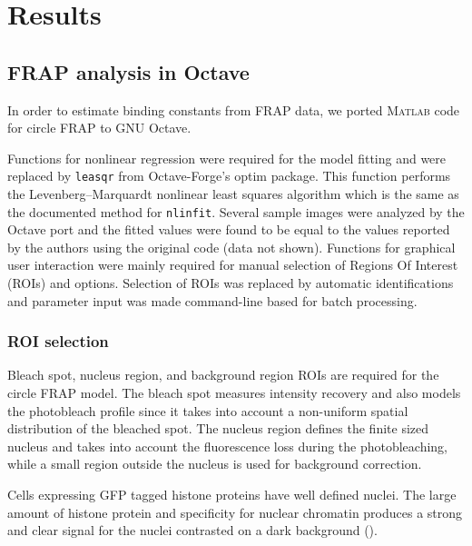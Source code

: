 \section{Results}

  \subsection{FRAP analysis in Octave}

    In order to estimate binding constants from FRAP data, we ported
    \textsc{Matlab} code for circle FRAP \citep{mueller2008evidence} to GNU Octave.

    Functions for nonlinear regression were required for the model
    fitting and were replaced by \texttt{leasqr}
    from Octave-Forge's optim package. This function performs the
    Levenberg--Marquardt nonlinear least squares algorithm which is the
    same as the documented method for \texttt{nlinfit}.
    Several sample images were analyzed
    by the Octave port and the fitted values were found to be equal to
    the values reported by the authors using the original code (data not shown).
    Functions for graphical user interaction were mainly required
    for manual selection of Regions Of Interest (ROIs) and options.
    Selection of ROIs was replaced by automatic identifications
    and parameter input was made command-line based for batch processing.

    \subsubsection{ROI selection}

      Bleach spot, nucleus region, and background region ROIs are required
      for the circle FRAP model. The bleach spot measures intensity recovery
      and also models the photobleach profile since it takes into account
      a non-uniform spatial distribution of the bleached spot. The nucleus
      region defines the finite sized nucleus and takes into account
      the fluorescence loss during the photobleaching,
      while a small region outside the nucleus is used for background correction.

      Cells expressing GFP tagged histone proteins have well defined nuclei.
      The large amount of histone protein and specificity for nuclear chromatin
      produces a strong and clear signal for the nuclei contrasted on a dark background ().

